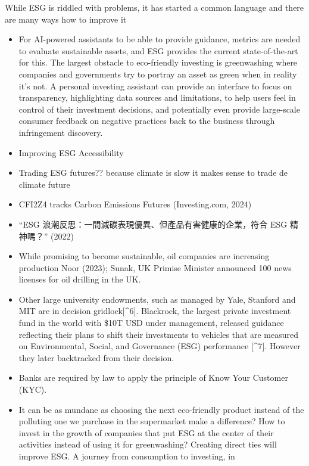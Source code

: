 \documentclass[
  letterpaper,
  DIV=11,
  numbers=noendperiod]{scrartcl}
\begin{document}
While ESG is riddled with problems, it has started a common language and
there are many ways how to improve it

\begin{itemize}
\item
  For AI-powered assistants to be able to provide guidance, metrics are
  needed to evaluate sustainable assets, and ESG provides the current
  state-of-the-art for this. The largest obstacle to eco-friendly
  investing is greenwashing where companies and governments try to
  portray an asset as green when in reality it's not. A personal
  investing assistant can provide an interface to focus on transparency,
  highlighting data sources and limitations, to help users feel in
  control of their investment decisions, and potentially even provide
  large-scale consumer feedback on negative practices back to the
  business through infringement discovery.
\item
  Improving ESG Accessibility
\item
  Trading ESG futures?? because climate is slow it makes sense to trade
  de climate future
\item
  CFI2Z4 tracks Carbon Emissions Futures (Investing.com, 2024)
\item
  {``{ESG 浪潮反思：一間減碳表現優異、但產品有害健康的企業，符合 ESG
  精神嗎？}''} (2022)
\item
  While promising to become sustainable, oil companies are increasing
  production Noor (2023); Sunak, UK Primise Minister announced 100 news
  licenses for oil drilling in the UK.
\item
  Other large university endowments, such as managed by Yale, Stanford
  and MIT are in decision gridlock{[}\^{}6{]}. Blackrock, the largest
  private investment fund in the world with \$10T USD under management,
  released guidance reflecting their plans to shift their investments to
  vehicles that are measured on Environmental, Social, and Governance
  (ESG) performance {[}\^{}7{]}. However they later backtracked from
  their decision.
\item
  Banks are required by law to apply the principle of Know Your Customer
  (KYC).
\item
  It can be as mundane as choosing the next eco-friendly product instead
  of the polluting one we purchase in the supermarket make a difference?
  How to invest in the growth of companies that put ESG at the center of
  their activities instead of using it for greenwashing? Creating direct
  ties will improve ESG. A journey from consumption to investing, in

\end{itemize}
\end{document}
